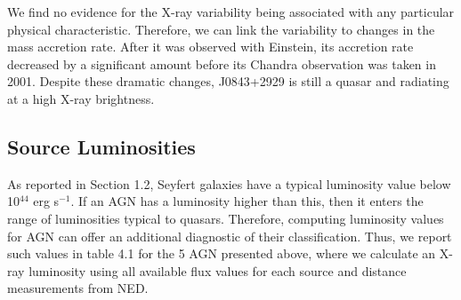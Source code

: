 We find no evidence for the X-ray variability being associated with any particular physical characteristic. 
Therefore, we can link the variability to changes in the mass accretion rate. 
After it was observed with Einstein, its accretion rate decreased by a significant amount before its Chandra observation was taken in 2001.
Despite these dramatic changes, J0843+2929 is still a quasar and radiating at a high X-ray brightness.


\FloatBarrier





\subsection{Source Luminosities}

As reported in Section 1.2, Seyfert galaxies have a typical luminosity value below 10$^{44}$ erg s$^{-1}$.
If an AGN has a luminosity higher than this, then it enters the range of luminosities typical to quasars.
Therefore, computing luminosity values for AGN can offer an additional diagnostic of their classification.
Thus, we report such values in table 4.1 for the 5 AGN presented above, where we calculate an X-ray luminosity using all available flux values for each source and distance measurements from NED.


    \begin{table}[h]
    \centering
    \caption{Luminosity values of AGN with accretion-related variability.}
    \end{table}

